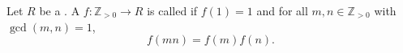 \begin{definition} \label{definition:multiplicative_function_on_positive_integers_with_values_in_a_ring}
Let $R$ be a . A  $f: \mathbb{Z}_{>0} \to R$ is called  if $f(1) = 1$ and for all $m, n \in \mathbb{Z}_{>0}$ with $\gcd(m, n) = 1$,
$$f(mn) = f(m)f(n).$$
\end{definition}

